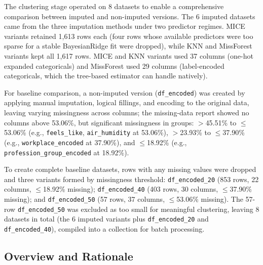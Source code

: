 The clustering stage operated on 8 datasets to enable a comprehensive comparison between imputed and non-imputed versions. The 6 imputed datasets came from the three imputation methods under two predictor regimes. MICE variants retained 1{,}613 rows each (four rows whose available predictors were too sparse for a stable BayesianRidge fit were dropped), while KNN and MissForest variants kept all 1{,}617 rows. MICE and KNN variants used 37 columns (one-hot expanded categoricals) and MissForest used 29 columns (label-encoded categoricals, which the tree-based estimator can handle natively).

For baseline comparison, a non-imputed version (\texttt{df\_encoded}) was created by applying manual imputation, logical fillings, and encoding to the original data, leaving varying missingness across columns; the missing-data report showed no columns above 53.06\%, but significant missingness in groups: $>$45.51\% to $\leq$53.06\% (e.g., \texttt{feels\_like}, \texttt{air\_humidity} at 53.06\%), $>$23.93\% to $\leq$37.90\% (e.g., \texttt{workplace\_encoded} at 37.90\%), and $\leq$18.92\% (e.g., \texttt{profession\_group\_encoded} at 18.92\%).

To create complete baseline datasets, rows with any missing values were dropped and three variants formed by missingness threshold: \texttt{df\_encoded\_20} (853 rows, 22 columns, $\leq$18.92\% missing); \texttt{df\_encoded\_40} (403 rows, 30 columns, $\leq$37.90\% missing); and \texttt{df\_encoded\_50} (57 rows, 37 columns, $\leq$53.06\% missing). The 57-row \texttt{df\_encoded\_50} was excluded as too small for meaningful clustering, leaving 8 datasets in total (the 6 imputed variants plus \texttt{df\_encoded\_20} and \texttt{df\_encoded\_40}), compiled into a collection for batch processing.

\subsection{Overview and Rationale}


